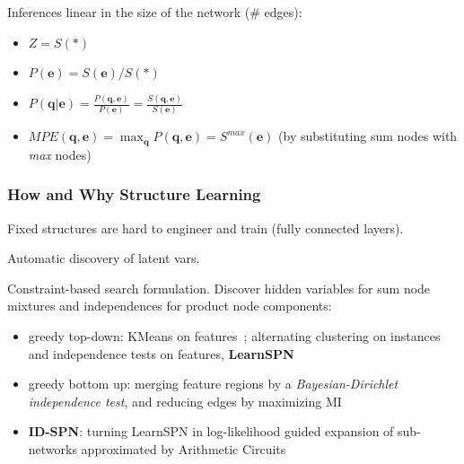 \documentclass[xcolor={usenames,dvipsnames,svgnames}, compress]{beamer}
\begin{document}
\begin{frame}
\begin{minipage}{0.62\linewidth}
    Inferences linear in the size of the network (\# edges):\\[-5pt]
    \begin{itemize}
    \item $Z = S(*)$
    \item $P(\mathbf{e}) = S(\mathbf{e})/S(*)$
    \item $P(\mathbf{q}| \mathbf{e}) = \frac{P(\mathbf{q},
        \mathbf{e})}{P(\mathbf{e})} = \frac{S(\mathbf{q},
        \mathbf{e})}{S(\mathbf{e})}$
    \item $MPE(\mathbf{q},\mathbf{e}) = \max_{\mathbf{q}}P(\mathbf{q},
      \mathbf{e}) = S^{max}(\mathbf{e})$  (by substituting sum nodes
      with \emph{max} nodes)
    \end{itemize}
     
    
    
  \end{minipage}
\end{frame}

\begin{frame}
  \frametitle{How and Why Structure Learning}
  \footnotesize
  Fixed structures are hard to engineer and train (fully connected layers).\par\bigskip
  
  Automatic discovery of latent vars.\par\bigskip

   Constraint-based search formulation. Discover hidden variables for sum node mixtures and independences
  for product node components:
  \begin{itemize}
    \itemsep 6pt
  \item greedy top-down: KMeans on features~\emph{\parencite{Dennis2012}}; alternating clustering on
    instances and independence tests on features, \textbf{LearnSPN}~\emph{\parencite{Gens2013}}

  \item greedy bottom up: merging feature regions by a \emph{Bayesian-Dirichlet independence test},  and reducing edges by maximizing MI\emph{~\parencite{Peharz2013}}

  

  \item \textbf{ID-SPN}: turning LearnSPN in log-likelihood guided expansion of sub-networks
    approximated by Arithmetic Circuits~\emph{\parencite{Rooshenas2014}}

  \end{itemize}
  \vspace{6pt}

  
\end{frame}
\end{document}
